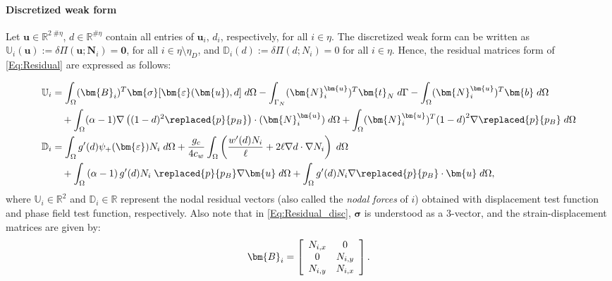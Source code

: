 \paragraph{Discretized weak form} Let $\mathbf{u}\in\mathbb{R}^{2\;\#\eta}$, $d\in\mathbb{R}^{\#\eta}$ contain all entries of $\mathbf{u}_i$, ${d}_i$, respectively, for all $i\in\eta$. The discretized weak form can be written as $\mathbb{U}_i (\mathbf{u}):= \delta \Pi (\bm{u}; \bm{N}_i)=\mathbf{0}$, for all $i\in\eta\setminus\eta_D$, and $\mathbb{D}_i({d}):=\delta\Pi ({d}; {N}_i)=0$ for all $i\in\eta$. %
Hence, the residual matrices form of \eqref{Eq:Residual} are expressed as follows:

\begin{equation}\label{Eq:Residual_disc}
	\begin{aligned}
		\mathbb{U}_i & = \int_\Omega (\bm{B}_i)^T \bm{\sigma}[\bm{\varepsilon}(\bm{u}), d] \;d\Omega - \int_{\Gamma_N} (\bm{N}^{\bm{u}}_{i})^T\bm{t}_N \; d\Gamma - \int_\Omega (\bm{N}^{\bm{u}}_{i})^T\bm{b} \; d\Omega\\ &\quad +\int_{\Omega} (\alpha-1)\nabla\left((1-d)^2 \replaced{p}{p_B}\right) \cdot (\bm{N}^{\bm{u}}_{i}) \; d\Omega +\int_{\Omega}  (\bm{N}^{\bm{u}}_{i})^T {\left(1 - d\right)}^2\nabla \replaced{p}{p_B}  \; d\Omega\\
	    \mathbb{D}_i &= \int_\Omega g'(d) \psi_+(\bm{\varepsilon}) N_i \; d\Omega + \frac{g_c}{4c_w} \int_\Omega  \left(\frac{w'(d) N_i}{\ell} + 2\ell \nabla d \cdot \nabla N_i \right)\;d\Omega \\& \quad+\int_{\Omega} \left(\alpha-1\right)g'(d)N_i \;\replaced{p}{p_B} \nabla \bm{u} \; d\Omega +	\int_{\Omega} g'(d) N_i \nabla \replaced{p}{p_B} \cdot \bm{u} \; d\Omega,
	\end{aligned}
\end{equation}
where $\mathbb{U}_i\in\mathbb{R}^2$ and $\mathbb{D}_i \in\mathbb{R}$ represent the nodal residual vectors (also called the \emph{nodal forces} of $i$) obtained with displacement test function and phase field test function, respectively. 
Also note that in \eqref{Eq:Residual_disc}, $\bm{\sigma}$ is understood as a 3-vector, %
and the strain-displacement matrices are given by:
\begin{equation*}
    \bm{B}_i=\left[
	\begin{array}{c c}
 	N_{i,x} &  0\\
 	0 & N_{i,y} \\
 	N_{i,y} & N_{i,x} \\
 	\end{array}
 	\right].
\end{equation*}

